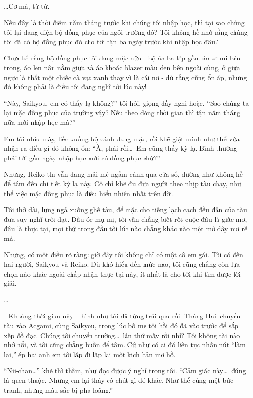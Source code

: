 \documentclass[../main.tex]{subfiles}
\begin{document}
\dots Cơ mà, từ từ.

Nếu đây là thời điểm năm tháng trước khi chúng tôi nhập học, thì tại sao chúng tôi lại đang diện bộ đồng phục của ngôi trường đó? Tôi không hề nhớ rằng chúng tôi đã có bộ đồng phục đó cho tới tận ba ngày trước khi nhập học đâu?

Chưa kể rằng bộ đồng phục tôi đang mặc nữa - bộ áo ba lớp gồm áo sơ mi bên trong, áo len nâu nằm giữa và áo khoác blazer màu den bên ngoài cùng, ở giữa ngực là thắt một chiếc cà vạt xanh thay vì là cái nơ - dù rằng cũng ổn áp, nhưng đó không phải là điều tôi đang nghĩ tới lúc này!

``Này, Saikyou, em có thấy lạ không?'' tôi hỏi, giọng đầy nghi hoặc. ``Sao chúng ta lại mặc đồng phục của trường vậy? Nếu theo dòng thời gian thì tận năm tháng nữa mới nhập học mà?''

Em tôi nhíu mày, liếc xuống bộ cánh đang mặc, rồi khẽ giật mình như thể vừa nhận ra điều gì đó không ổn: ``À, phải rồi\dots\ Em cũng thấy kỳ lạ. Bình thường phải tới gần ngày nhập học mới có đồng phục chứ?''

Nhưng, Reiko thì vẫn đang mải mê ngắm cảnh qua cửa sổ, dường như không hề để tâm đến chi tiết kỳ lạ này. Cô chỉ khẽ đu đưa người theo nhịp tàu chạy, như thể việc mặc đồng phục là điều hiển nhiên nhất trên đời.

Tôi thở dài, lưng ngả xuống ghế tàu, để mặc cho tiếng lạch cạch đều đặn của tàu đưa suy nghĩ trôi dạt. Đầu óc mụ mị, tôi vẫn chẳng biết rốt cuộc đâu là giấc mơ, đâu là thực tại, mọi thứ trong đầu tôi lúc nào chẳng khác nào một mớ dây mơ rễ má.

Nhưng, có một điều rõ ràng: giờ đây tôi không chỉ có một cô em gái. Tôi có đến hai người, Saikyou và Reiko. Dù khó hiểu đến mức nào, tôi cũng chẳng còn lựa chọn nào khác ngoài chấp nhận thực tại này, ít nhất là cho tới khi tìm được lời giải.

\dots

\dots Khoảng thời gian này\dots\ hình như tôi đã từng trải qua rồi. Tháng Hai, chuyến tàu vào Aogami, cùng Saikyou, trong lúc bố mẹ tôi hồi đó đã vào trước để sắp xếp đồ đạc. Chúng tôi chuyển trường\dots\ lần thứ mấy rồi nhỉ? Tôi không tài nào nhớ nổi, và tôi cũng chẳng buồn để tâm. Cứ như có ai đó liên tục nhấn nút ``làm lại,'' ép hai anh em tôi lặp đi lặp lại một kịch bản mơ hồ.

``Nii-chan\dots'' khẽ thì thầm, như đọc được ý nghĩ trong tôi. ``Cảm giác này\dots\ đúng là quen thuộc. Nhưng em lại thấy có chút gì đó khác. Như thể cùng một bức tranh, nhưng màu sắc bị pha loãng.''
\end{document}
